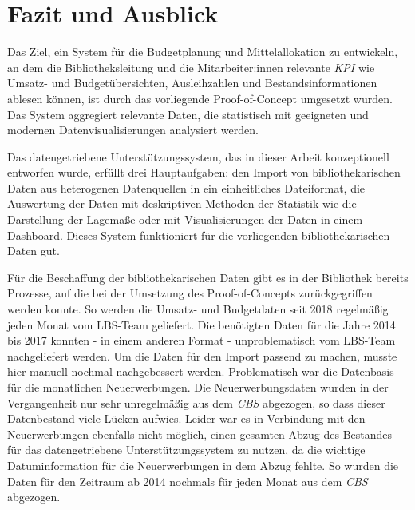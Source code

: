 
\chapter{Fazit und Ausblick}
\label{chap:six}
Das Ziel, ein System für die Budgetplanung und Mittelallokation zu entwickeln, an dem die
Bibliotheksleitung und die Mitarbeiter:innen relevante \textit{\acrlong{KPI}} wie Umsatz- und Budgetübersichten, Ausleihzahlen und Bestandsinformationen ablesen
können, ist durch das vorliegende Proof-of-Concept umgesetzt wurden. Das System aggregiert relevante Daten, die statistisch mit geeigneten und
modernen Datenvisualisierungen analysiert werden.

Das datengetriebene Unterstützungssystem, das in dieser Arbeit konzeptionell entworfen wurde, erfüllt drei Hauptaufgaben:
den Import von bibliothekarischen Daten aus heterogenen Datenquellen in ein einheitliches Dateiformat, die Auswertung der Daten mit deskriptiven Methoden der Statistik
wie die Darstellung der Lagemaße oder mit Visualisierungen der Daten in einem Dashboard.
Dieses System funktioniert für die vorliegenden bibliothekarischen Daten gut.

Für die Beschaffung der bibliothekarischen Daten gibt es in der Bibliothek bereits Prozesse, auf die bei der Umsetzung des Proof-of-Concepts 
zurückgegriffen werden konnte. So werden die Umsatz- und Budgetdaten seit 2018 regelmäßig jeden Monat vom LBS-Team geliefert. Die benötigten Daten für die 
Jahre 2014 bis 2017 konnten - in einem anderen Format - unproblematisch vom LBS-Team nachgeliefert werden. Um die Daten für den Import passend zu machen, 
musste hier manuell nochmal nachgebessert werden. Problematisch war die Datenbasis für die monatlichen Neuerwerbungen. Die Neuerwerbungsdaten wurden 
in der Vergangenheit nur sehr unregelmäßig aus dem \textit{\acrshort{CBS}} abgezogen, so dass dieser Datenbestand viele Lücken aufwies. Leider war es in Verbindung mit den Neuerwerbungen 
ebenfalls nicht möglich, einen gesamten Abzug des Bestandes für das datengetriebene Unterstützungssystem zu nutzen, da die wichtige Datuminformation für die 
Neuerwerbungen in dem Abzug fehlte. So wurden die Daten für den Zeitraum ab 2014 nochmals für jeden Monat aus dem \textit{\acrshort{CBS}} abgezogen. 



